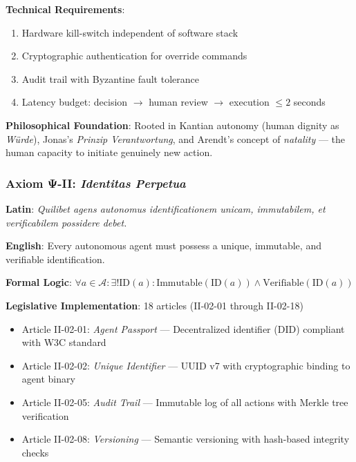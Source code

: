 \textbf{Technical Requirements}:
\begin{enumerate}
    \item Hardware kill-switch independent of software stack
    \item Cryptographic authentication for override commands
    \item Audit trail with Byzantine fault tolerance
    \item Latency budget: decision $\rightarrow$ human review $\rightarrow$ execution $\leq 2$ seconds
\end{enumerate}

\textbf{Philosophical Foundation}: Rooted in Kantian autonomy (human dignity as \textit{Würde}), Jonas's \textit{Prinzip Verantwortung}, and Arendt's concept of \textit{natality} — the human capacity to initiate genuinely new action.

\vspace{0.5cm}

\subsubsection{Axiom Ψ-II: \textit{Identitas Perpetua}}
\label{axiom:identitas}

\begin{tcolorbox}[colback=green!5!white,colframe=green!75!black,title=Formal Statement]
\textbf{Latin}: \textit{Quilibet agens autonomus identificationem unicam, immutabilem, et verificabilem possidere debet.}

\textbf{English}: Every autonomous agent must possess a unique, immutable, and verifiable identification.

\textbf{Formal Logic}: $\forall a \in \mathcal{A} : \exists! \text{ID}(a) : \text{Immutable}(\text{ID}(a)) \land \text{Verifiable}(\text{ID}(a))$
\end{tcolorbox}

\textbf{Legislative Implementation}: 18 articles (II-02-01 through II-02-18)
\begin{itemize}
    \item Article II-02-01: \textit{Agent Passport} — Decentralized identifier (DID) compliant with W3C standard
    \item Article II-02-02: \textit{Unique Identifier} — UUID v7 with cryptographic binding to agent binary
    \item Article II-02-05: \textit{Audit Trail} — Immutable log of all actions with Merkle tree verification
    \item Article II-02-08: \textit{Versioning} — Semantic versioning with hash-based integrity checks
\end{itemize}

